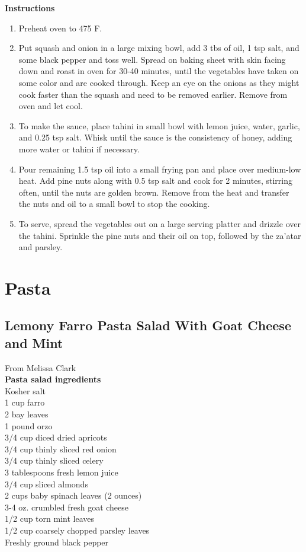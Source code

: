 \documentclass{article}
\numberwithin{figure}{section}
\numberwithin{equation}{section}
\begin{document}
{\bf Instructions}
\begin{enumerate}
\item Preheat oven to 475 F.

\item Put squash and onion in a large mixing bowl, add 3 tbs of oil, 1 tsp salt, and some black pepper and toss well. Spread on baking sheet with skin facing down and roast in oven for 30-40 minutes, until the vegetables have taken on some color and are cooked through. Keep an eye on the onions as they might cook faster than the squash and need to be removed earlier. Remove from oven and let cool.
\item To make the sauce, place tahini in small bowl with lemon juice, water, garlic, and 0.25 tsp salt. Whisk until the sauce is the consistency of honey, adding more water or tahini if necessary.
\item Pour remaining 1.5 tsp oil into a small frying pan and place over medium-low heat. Add pine nuts along with 0.5 tsp salt and cook for 2 minutes, stirring often, until the nuts are golden brown. Remove from the heat and transfer the nuts and oil to a small bowl to stop the cooking.
\item To serve, spread the vegetables out on a large serving platter and drizzle over the tahini. Sprinkle the pine nuts and their oil on top, followed by the za'atar and parsley.
\end{enumerate}


\pagebreak
\section{Pasta}

\pagebreak
\subsection{Lemony Farro Pasta Salad With Goat Cheese and Mint}
From Melissa Clark\\

{\bf Pasta salad ingredients}\\
Kosher salt\\
1 cup farro\\
2 bay leaves\\
1 pound orzo\\
3/4 cup diced dried apricots\\
3/4 cup thinly sliced red onion\\
3/4 cup thinly sliced celery\\
3 tablespoons fresh lemon juice\\
3/4 cup sliced almonds\\
2 cups baby spinach leaves (2 ounces)\\
3-4 oz. crumbled fresh goat cheese\\
1/2 cup torn mint leaves\\
1/2 cup coarsely chopped parsley leaves\\
Freshly ground black pepper\\ 
 
\end{document}
